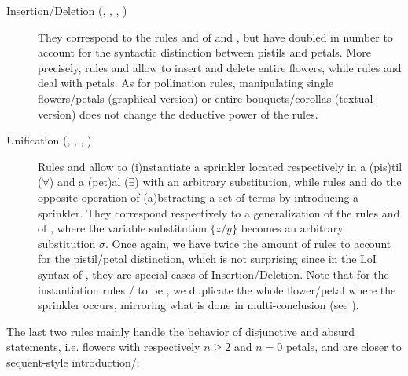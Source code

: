 \begin{description}
  \item[Insertion/Deletion (, , , )]
    They correspond to the rules  and  of  and
    , but have doubled in number to account for the syntactic
    distinction between pistils and petals. More precisely, rules  and
     allow to insert and delete entire flowers, while rules 
    and  deal with petals. As for pollination rules, manipulating
    single flowers/petals (graphical version) or entire bouquets/corollas
    (textual version) does not change the deductive power of the rules.
    
  \item[Unification (, , , )]
    Rules  and  allow to \textsf{(i)}nstantiate a sprinkler
    located respectively in a \textsf{(pis)}til ($\forall$) and a
    \textsf{(pet)}al ($\exists$) with an arbitrary substitution, while rules
     and  do the opposite operation of
    \textsf{(a)}bstracting a set of terms by introducing a sprinkler. They
    correspond respectively to a generalization of the rules  and
     of , where the variable substitution $\{z/y\}$
    becomes an arbitrary substitution $\sigma$. Once again, we have twice the
    amount of rules to account for the pistil/petal distinction, which is not
    surprising since in the LoI syntax of , they are special cases of
    Insertion/Deletion. Note that for the instantiation rules
    / to be , we duplicate the whole flower/petal
    where the sprinkler occurs, mirroring what is done in multi-conclusion
     (see ).
\end{description}

The last two rules mainly handle the behavior of disjunctive and absurd
statements, i.e. flowers with respectively $n \geq 2$ and $n = 0$ petals, and
are closer to sequent-style introduction/:

